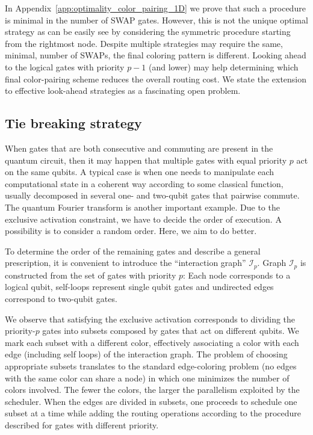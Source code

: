 \documentclass[%
onecolumn,pra,
superscriptaddress,
nofootinbib,
 amsmath,amssymb,
 aps,
11pt,
]{revtex4-1}
\begin{document}
In Appendix~\ref{app:optimality_color_pairing_1D} we prove that such a procedure is minimal in the number of SWAP gates. However, this is not the unique optimal strategy as can be easily see by considering the symmetric procedure starting from the rightmost node. Despite multiple strategies may require the same, minimal, number of SWAPs, the final coloring pattern is different. Looking ahead to the logical gates with priority $p-1$ (and lower) may help determining which final color-pairing scheme reduces the overall routing cost. We state the extension to effective look-ahead strategies as a fascinating open problem.



\subsection{Tie breaking strategy}
\label{sec:PDPT_tiebreaking}

When gates that are both consecutive and commuting are present in the quantum circuit, then it may happen that multiple gates with equal priority $p$ act on the same qubits. A typical case is when one needs to manipulate each computational state in a coherent way according to some classical function, usually decomposed in several one- and two-qubit gates that pairwise commute. The quantum Fourier transform is another important example. Due to the exclusive activation constraint, we have to decide the order of execution. A possibility is to consider a random order. Here, we aim to do better.

To determine the order of the remaining gates and describe a general prescription, it is convenient to introduce the ``interaction graph'' $\mathcal{I}_p$. Graph $\mathcal{I}_p$ is constructed from the set of gates with priority $p$: Each node corresponds to a logical qubit, self-loops represent single qubit gates and undirected edges correspond to two-qubit gates.%

We observe that satisfying the exclusive activation corresponds to dividing the priority-$p$ gates into subsets composed by gates that act on different qubits. We mark each subset with a different color, effectively associating a color with each edge (including self loops) of the interaction graph. The problem of choosing appropriate subsets translates to the standard edge-coloring problem (no edges with the same color can share a node) in which one minimizes the number of colors involved. The fewer the colors, the larger the parallelism exploited by the scheduler. When the edges are divided in subsets, one proceeds to schedule one subset at a time while adding the routing operations according to the procedure described for gates with different priority.
\end{document}

